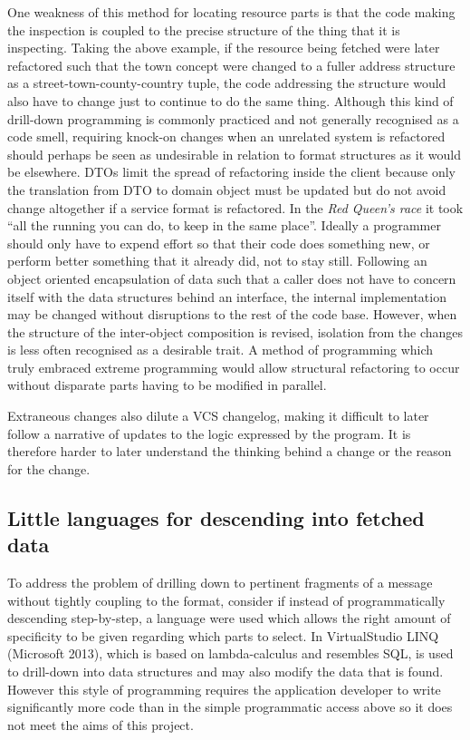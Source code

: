 \documentclass[12pt, ]{article}
\begin{document}
One weakness of this method for locating resource parts is that the code
making the inspection is coupled to the precise structure of the thing
that it is inspecting. Taking the above example, if the resource being
fetched were later refactored such that the town concept were changed to
a fuller address structure as a street-town-county-country tuple, the
code addressing the structure would also have to change just to continue
to do the same thing. Although this kind of drill-down programming is
commonly practiced and not generally recognised as a code smell,
requiring knock-on changes when an unrelated system is refactored should
perhaps be seen as undesirable in relation to format structures as it
would be elsewhere. DTOs limit the spread of refactoring inside the
client because only the translation from DTO to domain object must be
updated but do not avoid change altogether if a service format is
refactored. In the \emph{Red Queen's race} it took ``all the running you
can do, to keep in the same place''. Ideally a programmer should only
have to expend effort so that their code does something new, or perform
better something that it already did, not to stay still. Following an
object oriented encapsulation of data such that a caller does not have
to concern itself with the data structures behind an interface, the
internal implementation may be changed without disruptions to the rest
of the code base. However, when the structure of the inter-object
composition is revised, isolation from the changes is less often
recognised as a desirable trait. A method of programming which truly
embraced extreme programming would allow structural refactoring to occur
without disparate parts having to be modified in parallel.

Extraneous changes also dilute a VCS changelog, making it difficult to
later follow a narrative of updates to the logic expressed by the
program. It is therefore harder to later understand the thinking behind
a change or the reason for the change.

\subsection{Little languages for descending into fetched
data}\label{little-languages-for-descending-into-fetched-data}

\label{jsonpathxpath}

To address the problem of drilling down to pertinent fragments of a
message without tightly coupling to the format, consider if instead of
programmatically descending step-by-step, a language were used which
allows the right amount of specificity to be given regarding which parts
to select. In VirtualStudio LINQ (Microsoft 2013), which is based on
lambda-calculus and resembles SQL, is used to drill-down into data
structures and may also modify the data that is found. However this
style of programming requires the application developer to write
significantly more code than in the simple programmatic access above so
it does not meet the aims of this project.
\end{document}
